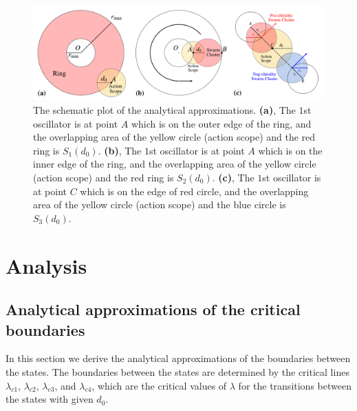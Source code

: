 \documentclass[%
 aip,
 amsmath,amssymb,
 reprint,%
]{revtex4-1}
\begin{document}
\begin{figure}
    \includegraphics[width=\textwidth]{./figs/analyticalEps.pdf}
    \caption{
        \label{fig:analyticalEps}
        The schematic plot of the analytical approximations.
        \textbf{(a)}, The $1$st oscillator is at point $A$ which is on the outer edge of the ring, and the overlapping area of the yellow circle (action scope) and the red ring is $S_1\left( d_0 \right)$.
        \textbf{(b)}, The $1$st oscillator is at point $A$ which is on the inner edge of the ring, and the overlapping area of the yellow circle (action scope) and the red ring is $S_2\left( d_0 \right)$.
        \textbf{(c)}, The $1$st oscillator is at point $C$ which is on the edge of red circle, and the overlapping area of the yellow circle (action scope) and the blue circle is $S_3\left( d_0 \right)$.
    }
\end{figure}

\section{\label{sec:analysis}Analysis}

\subsection{\label{critical} Analytical approximations of the critical boundaries}

In this section we derive the analytical approximations of the boundaries between the states. 
The boundaries between the states are determined by the critical lines $\lambda_{c1}$, $\lambda_{c2}$, $\lambda_{c3}$, and $\lambda_{c4}$, which are the critical values of $\lambda$ for the transitions between the states with given $d_0$.
\end{document}
